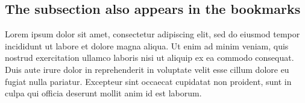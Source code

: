 \subsection{The subsection also appears in the bookmarks}

Lorem ipsum dolor sit amet, consectetur adipiscing elit, sed do eiusmod tempor
incididunt ut labore et dolore magna aliqua. Ut enim ad minim veniam, quis
nostrud exercitation ullamco laboris nisi ut aliquip ex ea commodo consequat.
Duis aute irure dolor in reprehenderit in voluptate velit esse cillum dolore eu
fugiat nulla pariatur. Excepteur sint occaecat cupidatat non proident, sunt in
culpa qui officia deserunt mollit anim id est laborum.